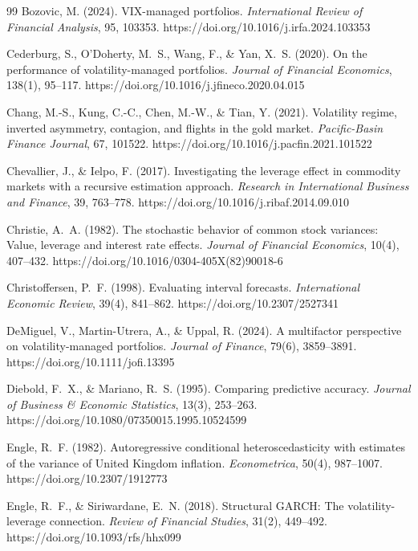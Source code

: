 \documentclass[review,12pt]{elsarticle}
\begin{document}
\begin{thebibliography}{99}
Bozovic, M. (2024). VIX-managed portfolios. \textit{International Review of Financial Analysis}, 95, 103353. https://doi.org/10.1016/j.irfa.2024.103353

Cederburg, S., O'Doherty, M.~S., Wang, F., \& Yan, X.~S. (2020). On the performance of volatility-managed portfolios. \textit{Journal of Financial Economics}, 138(1), 95--117. https://doi.org/10.1016/j.jfineco.2020.04.015

Chang, M.-S., Kung, C.-C., Chen, M.-W., \& Tian, Y. (2021). Volatility regime, inverted asymmetry, contagion, and flights in the gold market. \textit{Pacific-Basin Finance Journal}, 67, 101522. https://doi.org/10.1016/j.pacfin.2021.101522

Chevallier, J., \& Ielpo, F. (2017). Investigating the leverage effect in commodity markets with a recursive estimation approach. \textit{Research in International Business and Finance}, 39, 763--778. https://doi.org/10.1016/j.ribaf.2014.09.010

Christie, A.~A. (1982). The stochastic behavior of common stock variances: Value, leverage and interest rate effects. \textit{Journal of Financial Economics}, 10(4), 407--432. https://doi.org/10.1016/0304-405X(82)90018-6

Christoffersen, P.~F. (1998). Evaluating interval forecasts. \textit{International Economic Review}, 39(4), 841--862. https://doi.org/10.2307/2527341

DeMiguel, V., Martin-Utrera, A., \& Uppal, R. (2024). A multifactor perspective on volatility-managed portfolios. \textit{Journal of Finance}, 79(6), 3859--3891. https://doi.org/10.1111/jofi.13395

Diebold, F.~X., \& Mariano, R.~S. (1995). Comparing predictive accuracy. \textit{Journal of Business \& Economic Statistics}, 13(3), 253--263. https://doi.org/10.1080/07350015.1995.10524599

Engle, R.~F. (1982). Autoregressive conditional heteroscedasticity with estimates of the variance of United Kingdom inflation. \textit{Econometrica}, 50(4), 987--1007. https://doi.org/10.2307/1912773

Engle, R.~F., \& Siriwardane, E.~N. (2018). Structural GARCH: The volatility-leverage connection. \textit{Review of Financial Studies}, 31(2), 449--492. https://doi.org/10.1093/rfs/hhx099


\end{thebibliography}
\end{document}
